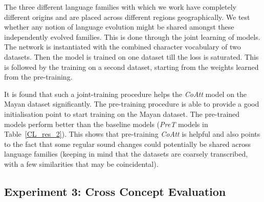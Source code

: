 \documentclass[11pt,letterpaper]{article}
\begin{document}
The three different language families with which we work have completely different origins and are placed across different regions geographically. We test whether any notion of language evolution might be shared amongst these independently evolved families. This is done through the joint learning of models. The network is instantiated with the combined character vocabulary of two datasets. Then the model is trained on one dataset till the loss is saturated. This is followed by the training on a second dataset, starting from the weights learned from the pre-training. 

It is found that such a joint-training procedure helps the \textit{CoAtt} model on the Mayan dataset significantly. The pre-training procedure is able to provide a good initialisation point to start training on the Mayan dataset. The pre-trained models perform better than the baseline models (\textit{PreT} models in Table~\ref{CL_res_2}). This shows that pre-training \textit{CoAtt} is helpful and also points to the fact that some regular sound changes could potentially be shared across language families (keeping in mind that the datasets are coarsely transcribed, with a few similarities that may be coincidental). 


\subsection{Experiment 3: Cross Concept Evaluation}
\end{document}
